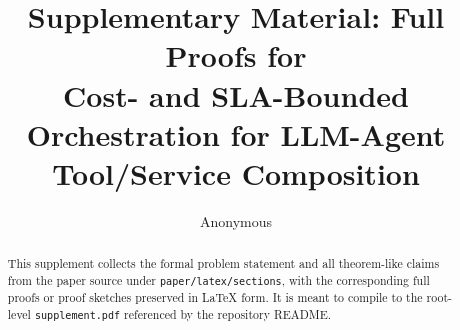 \documentclass[11pt]{article}
\title{Supplementary Material: Full Proofs for\\
Cost- and SLA-Bounded Orchestration for LLM-Agent Tool/Service Composition}
\author{Anonymous}
\date{}
\begin{document}
\maketitle

\begin{abstract}
This supplement collects the formal problem statement and all
theorem-like claims from the paper source under
\texttt{paper/latex/sections}, with the corresponding full proofs or
proof sketches preserved in \LaTeX{} form. It is meant to compile to
the root-level \texttt{supplement.pdf} referenced by the repository
README.
\end{abstract}

\tableofcontents
\clearpage









\end{document}
